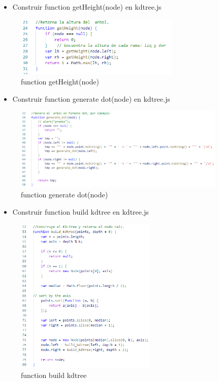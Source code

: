 \documentclass{article}
\begin{document}
\begin{enumerate}
\begin{itemize}
   \item Construir function getHeight(node) en kdtree.js
\end{itemize}

\begin{figure}[H]
\centering
\includegraphics[width=0.7\textwidth]{Img/getHeight_kdtree.png}
\caption{function getHeight(node)}
\end{figure}

\begin{itemize}
   \item Construir function generate dot(node) en kdtree.js
\end{itemize}

\begin{figure}[H]
\centering
\includegraphics[width=0.9\textwidth]{Img/generate_dot_kdtree.png}
\caption{function generate dot(node)}
\end{figure}

\begin{itemize}
   \item Construir function build kdtree en kdtree.js
\end{itemize}

\begin{figure}[H]
\centering
\includegraphics[width=0.6\textwidth]{Img/build_kdtree.png}
\caption{function build kdtree}
\end{figure}


\end{enumerate}
\end{document}
